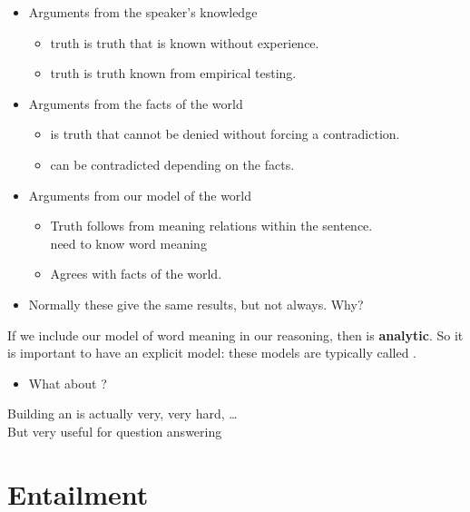 \documentclass[headrule,footrule]{foils}
\begin{document}
\begin{itemize}
\item Arguments from the speaker's knowledge
\begin{itemize}
\item {} truth is truth that is known without experience.
\item {} truth is truth known from empirical testing.
\end{itemize}
\item Arguments from the facts of the world
  \begin{itemize}
  \item {} is truth that cannot be denied without forcing a
    contradiction.
  \item {} can be contradicted depending on the facts.
  \end{itemize}
\item Arguments from our model of the world
\begin{itemize}
\item {} Truth follows from meaning relations  within the sentence.
\\ need to know word meaning
\item {} Agrees with facts of the world.
\end{itemize}
\item Normally these give the same results, but not always.  Why?
\end{itemize}

If we include our model of word meaning in our reasoning, then  is \textbf{analytic}.  So it is important to have
an explicit model: these models are typically called .

\begin{itemize}
\item What about ?
\end{itemize}

Building an  is actually very, very hard, \ldots
\\ But very useful for question answering

\section{Entailment}
\end{document}
